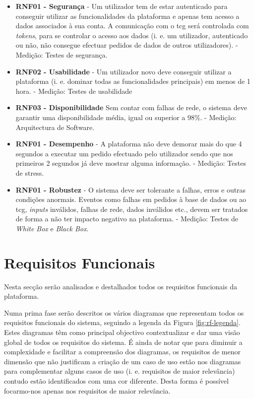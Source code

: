 \begin{itemize}
	\item \textbf{RNF01 - Segurança}
	\subitem - Um utilizador tem de estar autenticado para conseguir utilizar as funcionalidades da plataforma e apenas tem acesso a dados associados à sua conta. A comunicação com o \acrshort{tcg} será controlada com \textit{tokens}, para se controlar o acesso aos dados (i. e. um utilizador, autenticado ou não, não consegue efectuar pedidos de dados de outros utilizadores).
	\subitem - Medição: Testes de segurança.
	
	\item \textbf{RNF02 - Usabilidade} 
	\subitem - Um utilizador novo deve conseguir utilizar a plataforma (i. e. dominar todas as funcionalidades principais) em menos de 1 hora.
	\subitem - Medição: Testes de usabilidade
	
	\item \textbf{RNF03 - Disponibilidade}
	\subitem Sem contar com falhas de rede, o sistema deve garantir uma disponibilidade média, igual ou superior a 98\%.
	\subitem - Medição: Arquitectura de Software.
	
	\item \textbf{RNF01 - Desempenho}
	\subitem - A plataforma não deve demorar mais do que 4 segundos a executar um pedido efectuado pelo utilizador sendo que nos primeiros 2 segundos já deve mostrar alguma informação.
	\subitem - Medição: Testes de stress.
	
	\item \textbf{RNF01 - Robustez}
	\subitem - O sistema deve ser tolerante a falhas, erros e outras condições anormais. Eventos como falhas em pedidos à base de dados ou ao \acrshort{tcg}, \textit{inputs} inválidos, falhas de rede, dados inválidos etc., devem ser tratados de forma a não ter impacto negativo na plataforma.
	\subitem - Medição: Testes de \textit{White Box} e \textit{Black Box}.
\end{itemize}


\section{Requisitos Funcionais}
\label{rf}

Nesta secção serão analisados e destalhados todos os requisitos funcionais da plataforma.

Numa prima fase serão descritos os vários diagramas que representam todos os requisitos funcionais do sistema, seguindo a legenda da Figura \ref{fig:rf-legenda}. Estes diagramas têm como principal objectivo contextualizar e dar uma visão global de todos os requisitos do sistema. É ainda de notar que para diminuir a complexidade e facilitar a compreensão dos diagramas, os requisitos de menor dimensão que não justificam a criação de um caso de uso estão nos diagramas para complementar alguns casos de uso (i. e. requisitos de maior relevância) contudo estão identificados com uma cor diferente. Desta forma é possível focarmo-nos apenas nos requisitos de maior relevância.

